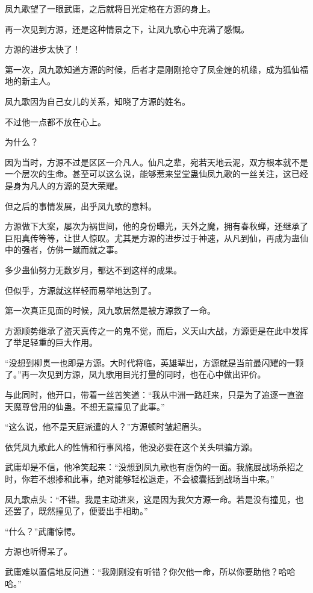 \begin{this_body}
凤九歌望了一眼武庸，之后就将目光定格在方源的身上。

再一次见到方源，还是这种情景之下，让凤九歌心中充满了感慨。

方源的进步太快了！

第一次，凤九歌知道方源的时候，后者才是刚刚抢夺了凤金煌的机缘，成为狐仙福地的新主人。

凤九歌因为自己女儿的关系，知晓了方源的姓名。

不过他一点都不放在心上。

为什么？

因为当时，方源不过是区区一介凡人。仙凡之辈，宛若天地云泥，双方根本就不是一个层次的生命。甚至可以这么说，能够惹来堂堂蛊仙凤九歌的一丝关注，这已经是身为凡人的方源的莫大荣耀。

但之后的事情发展，出乎凤九歌的意料。

方源做下大案，屡次为祸世间，他的身份曝光，天外之魔，拥有春秋蝉，还继承了巨阳真传等等，让世人惊叹。尤其是方源的进步过于神速，从凡到仙，再成为蛊仙中的强者，仿佛一蹴而就之事。

多少蛊仙努力无数岁月，都达不到这样的成果。

但似乎，方源就这样轻而易举地达到了。

第一次真正见面的时候，凤九歌居然是被方源救了一命。

方源顺势继承了盗天真传之一的鬼不觉，而后，义天山大战，方源更是在此中发挥了举足轻重的巨大作用。

“没想到柳贯一也即是方源。大时代将临，英雄辈出，方源就是当前最闪耀的一颗了。”再一次见到方源，凤九歌用目光打量的同时，也在心中做出评价。

与此同时，他开口，带着一丝苦笑道：“我从中洲一路赶来，只是为了追逐一直盗天魔尊曾用的仙蛊。不想无意撞见了此事。”

“这么说，他不是天庭派遣的人？”方源顿时皱起眉头。

依凭凤九歌此人的性情和行事风格，他没必要在这个关头哄骗方源。

武庸却是不信，他冷笑起来：“没想到凤九歌也有虚伪的一面。我施展战场杀招之时，你若不想掺和此事，绝对能够轻松退走，不会被囊括到战场当中来。”

凤九歌点头：“不错。我是主动进来，这是因为我欠方源一命。若是没有撞见，也还罢了，既然撞见了，便要出手相助。”

“什么？”武庸惊愕。

方源也听得呆了。

武庸难以置信地反问道：“我刚刚没有听错？你欠他一命，所以你要助他？哈哈哈。”


\end{this_body}
